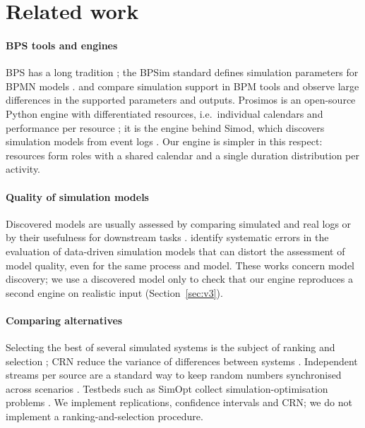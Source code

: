 \documentclass[preprint,12pt,nonatbib]{elsarticle}
\begin{document}
\section{Related work}
\label{sec:related}
\paragraph{BPS tools and engines} BPS has a long tradition \citep{vanderaalst2015}; the BPSim standard defines simulation parameters for BPMN models \citep{laue2016}. \citet{pereira2016} and \citet{rosenthal2021} compare simulation support in BPM tools and observe large differences in the supported parameters and outputs. Prosimos is an open-source Python engine with differentiated resources, i.e.\ individual calendars and performance per resource \citep{lopezpintado2022}; it is the engine behind Simod, which discovers simulation models from event logs \citep{camargo2020,lopezpintado2024}. Our engine is simpler in this respect: resources form roles with a shared calendar and a single duration distribution per activity.

\paragraph{Quality of simulation models} Discovered models are usually assessed by comparing simulated and real logs \citep{chapela2023,chapela2025} or by their usefulness for downstream tasks \citep{oezdemir2025}. \citet{bluemel2026} identify systematic errors in the evaluation of data-driven simulation models that can distort the assessment of model quality, even for the same process and model. These works concern model discovery; we use a discovered model only to check that our engine reproduces a second engine on realistic input (Section~\ref{sec:v3}).

\paragraph{Comparing alternatives} Selecting the best of several simulated systems is the subject of ranking and selection \citep{bechhofer1954,kim2001}; CRN reduce the variance of differences between systems \citep{nelson1995,law2015}. Independent streams per source are a standard way to keep random numbers synchronised across scenarios \citep{lecuyer2002}. Testbeds such as SimOpt collect simulation-optimisation problems \citep{pasupathy2006,eckman2023}. We implement replications, confidence intervals and CRN; we do not implement a ranking-and-selection procedure.
\end{document}
